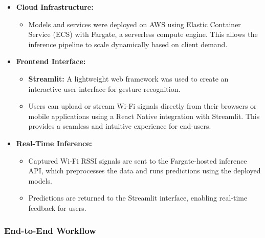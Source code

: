 \documentclass[10pt,twocolumn,letterpaper]{article}
\begin{document}
\begin{itemize}
\begin{itemize}
        \end{itemize}
    \item \textbf{Cloud Infrastructure:}
        \begin{itemize}
            \item Models and services were deployed on AWS using Elastic Container Service (ECS) with Fargate, a serverless compute engine. This allows the inference pipeline to scale dynamically based on client demand.
        \end{itemize}
    \item \textbf{Frontend Interface:}
        \begin{itemize}
            \item \textbf{Streamlit:} A lightweight web framework was used to create an interactive user interface for gesture recognition.
            \item Users can upload or stream Wi-Fi signals directly from their browsers or mobile applications using a React Native integration with Streamlit. This provides a seamless and intuitive experience for end-users.
        \end{itemize}
    \item \textbf{Real-Time Inference:}
        \begin{itemize}
            \item Captured Wi-Fi RSSI signals are sent to the Fargate-hosted inference API, which preprocesses the data and runs predictions using the deployed models.
            \item Predictions are returned to the Streamlit interface, enabling real-time feedback for users.
        \end{itemize}
\end{itemize}

\subsubsection{End-to-End Workflow}
\end{document}
